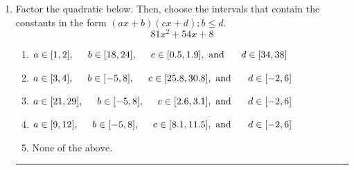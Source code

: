 \documentclass[14pt]{extbook}
\newcommand{\litem}[1]{\item#1\hspace*{-1cm}\rule{\textwidth}{0.4pt}}
\begin{document}
\begin{enumerate}
{\begin{enumerate}[label=\Alph*.]
\end{enumerate} }
\litem{
Factor the quadratic below. Then, choose the intervals that contain the constants in the form $(ax+b)(cx+d); b \leq d.$\[ 81x^{2} +54 x + 8 \]\begin{enumerate}[label=\Alph*.]
\item \( a \in [1, 2], \hspace*{5mm} b \in [18, 24], \hspace*{5mm} c \in [0.5, 1.9], \text{ and } \hspace*{5mm} d \in [34, 38] \)
\item \( a \in [3, 4], \hspace*{5mm} b \in [-5, 8], \hspace*{5mm} c \in [25.8, 30.8], \text{ and } \hspace*{5mm} d \in [-2, 6] \)
\item \( a \in [21, 29], \hspace*{5mm} b \in [-5, 8], \hspace*{5mm} c \in [2.6, 3.1], \text{ and } \hspace*{5mm} d \in [-2, 6] \)
\item \( a \in [9, 12], \hspace*{5mm} b \in [-5, 8], \hspace*{5mm} c \in [8.1, 11.5], \text{ and } \hspace*{5mm} d \in [-2, 6] \)
\item \( \text{None of the above.} \)


\end{enumerate}}
\end{enumerate}
\end{document}
